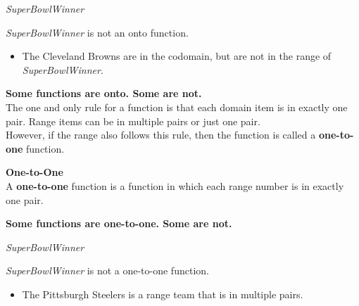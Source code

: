 \documentclass{ximera}
\begin{document}
\begin{example} \textit{SuperBowlWinner}


\textit{SuperBowlWinner} is not an onto function.


\begin{itemize}
\item The Cleveland Browns are in the codomain, but are not in the range of \textit{SuperBowlWinner}.  
\end{itemize}

\end{example}







\textbf{\textcolor{blue!55!black}{Some functions are onto. Some are not.}}  \\




The one and only rule for a function is that each domain item is in exactly one pair.  Range items can be in multiple pairs or just one pair. \\

However, if the range also follows this rule, then the function is called a \textbf{one-to-one} function.



\begin{definition} \textbf{\textcolor{green!50!black}{One-to-One}} \\

A \textbf{one-to-one} function is a function in which each range number is in exactly one pair.

\end{definition}




\textbf{\textcolor{blue!55!black}{Some functions are one-to-one. Some are not.}}  \\














\begin{example} \textit{SuperBowlWinner}


\textit{SuperBowlWinner} is not a one-to-one function.


\begin{itemize}
\item The Pittsburgh Steelers is a range team that is in multiple pairs. 
\end{itemize}

\end{example}
\end{document}

